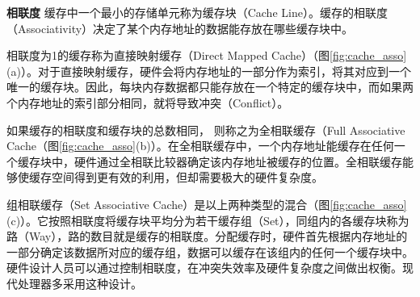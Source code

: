 \textbf{相联度}
缓存中一个最小的存储单元称为缓存块（Cache Line）。缓存的相联度（Associativity）决定了某个内存地址的数据能存放在哪些缓存块中。

相联度为1的缓存称为直接映射缓存（Direct Mapped Cache）（图\ref{fig:cache_asso}(a)）。对于直接映射缓存，硬件会将内存地址的一部分作为索引，将其对应到一个唯一的缓存块。因此，每块内存数据都只能存放在一个特定的缓存块中，而如果两个内存地址的索引部分相同，就将导致冲突（Conflict）。

如果缓存的相联度和缓存块的总数相同， 则称之为全相联缓存（Full Associative Cache（图\ref{fig:cache_asso}(b)）。在全相联缓存中，一个内存地址能缓存在任何一个缓存块中，硬件通过全相联比较器确定该内存地址被缓存的位置。全相联缓存能够使缓存空间得到更有效的利用，但却需要极大的硬件复杂度。

组相联缓存（Set Associative Cache）是以上两种类型的混合（图\ref{fig:cache_asso}(c)）。它按照相联度将缓存块平均分为若干缓存组（Set），同组内的各缓存块称为路（Way），路的数目就是缓存的相联度。分配缓存时，硬件首先根据内存地址的一部分确定该数据所对应的缓存组，数据可以缓存在该组内的任何一个缓存块中。硬件设计人员可以通过控制相联度，在冲突失效率及硬件复杂度之间做出权衡。现代处理器多采用这种设计。

